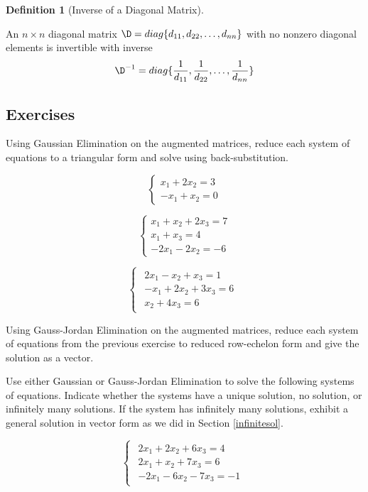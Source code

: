 \documentclass[
]{article}
\theoremstyle{definition}
\newtheorem{definition}{Definition}[section]
\theoremstyle{definition}
\theoremstyle{definition}
\theoremstyle{definition}
\theoremstyle{remark}
\begin{document}
\begin{definition}[Inverse of a Diagonal Matrix]
\protect\hypertarget{def:diaginverse}{}\label{def:diaginverse}

An \(n\times n\) diagonal matrix \(\D = diag\{d_{11},d_{22},\dots,d_{nn}\}\) with no nonzero diagonal elements is invertible with inverse
\[\D^{-1} = diag\{\frac{1}{d_{11}},\frac{1}{d_{22}},\dots,\frac{1}{d_{nn}}\}\]

\end{definition}

\hypertarget{exercises-2}{%
\subsection{Exercises}\label{exercises-2}}

Using Gaussian Elimination on the augmented matrices, reduce each system of equations to a triangular form and solve using back-substitution.

\[\begin{cases}
x_1 +2x_2= 3\\
-x_1+x_2=0\end{cases}\]

\[\begin{cases}
x_1+x_2 +2x_3= 7\\
x_1+x_3 = 4\\
-2x_1-2x_2 =-6\end{cases}\]

\[\begin{cases}\begin{align}
2x_1-x_2 +x_3= 1\\
-x_1+2x_2+3x_3 = 6\\
x_2+4x_3 =6 \end{align}\end{cases}\]

Using Gauss-Jordan Elimination on the augmented matrices, reduce each system of equations from the previous exercise to reduced row-echelon form and give the solution as a vector.

Use either Gaussian or Gauss-Jordan Elimination to solve the following systems of equations. Indicate whether the systems have a unique solution, no solution, or infinitely many solutions. If the system has infinitely many solutions, exhibit a general solution in vector form as we did in Section \ref{infinitesol}.

\[\begin{cases}\begin{align}
        2x_1+2x_2+6x_3=4\\
        2x_1+x_2+7x_3=6\\
        -2x_1-6x_2-7x_3=-1\end{align}\end{cases}\]
\end{document}
